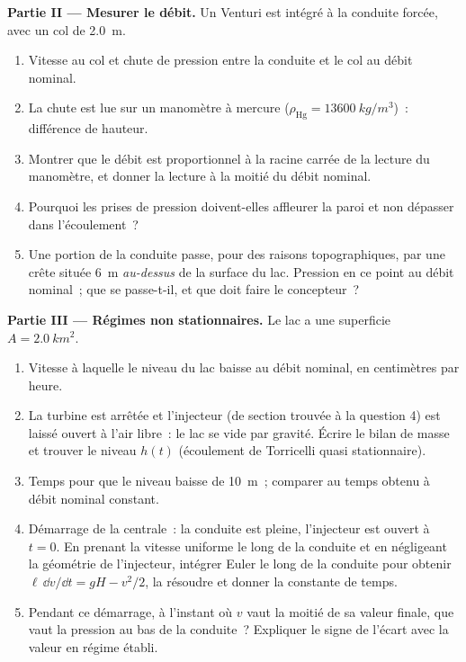 \begin{problem}
\medskip
\noindent\textbf{Partie II --- Mesurer le débit.}
Un Venturi est intégré à la conduite forcée, avec un col de \qty{2.0}{m}.
\begin{enumerate}[resume]
  \item Vitesse au col et chute de pression entre la conduite et le
        col au débit nominal.
  \item La chute est lue sur un manomètre à mercure ($\rho_{\text{Hg}} =
        \qty{13600}{kg/m^3}$)~: différence de hauteur.
  \item Montrer que le débit est proportionnel à la racine carrée de
        la lecture du manomètre, et donner la lecture à la moitié du débit
        nominal.
  \item Pourquoi les prises de pression doivent-elles affleurer la paroi et non
        dépasser dans l'écoulement~?
  \item Une portion de la conduite passe, pour des raisons topographiques, par une
        crête située \qty{6}{m} \emph{au-dessus} de la surface du lac. Pression en ce point
        au débit nominal~; que se passe-t-il, et que doit faire le concepteur~?
\end{enumerate}

\medskip
\noindent\textbf{Partie III --- Régimes non stationnaires.}
Le lac a une superficie $A = \qty{2.0}{km^2}$.
\begin{enumerate}[resume]
  \item Vitesse à laquelle le niveau du lac baisse au débit nominal, en
        centimètres par heure.
  \item La turbine est arrêtée et l'injecteur (de section trouvée à la question 4)
        est laissé ouvert à l'air libre~: le lac se vide par gravité. Écrire
        le bilan de masse et trouver le niveau $h(t)$ (écoulement de Torricelli
        quasi stationnaire).
  \item Temps pour que le niveau baisse de \qty{10}{m}~; comparer au temps
        obtenu à débit nominal constant.
  \item Démarrage de la centrale~: la conduite est pleine, l'injecteur est ouvert
        à $t = 0$. En prenant la vitesse uniforme le long de la conduite et en
        négligeant la géométrie de l'injecteur, intégrer Euler le long de
        la conduite pour obtenir $\ell\,\dd v/\dd t = gH - v^2/2$, la résoudre et donner
        la constante de temps.
  \item Pendant ce démarrage, à l'instant où $v$ vaut la moitié de sa valeur
        finale, que vaut la pression au bas de la conduite~?
        Expliquer le signe de l'écart avec la valeur en régime établi.
\end{enumerate}


\end{problem}
